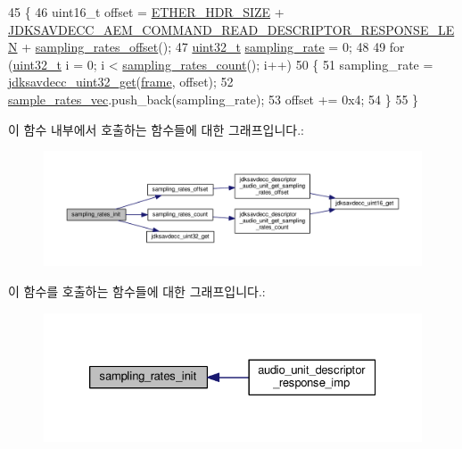 \begin{DoxyCode}
45 \{
46     uint16\_t offset = \hyperlink{namespaceavdecc__lib_a6c827b1a0d973e18119c5e3da518e65ca9512ad9b34302ba7048d88197e0a2dc0}{ETHER\_HDR\_SIZE} + 
      \hyperlink{group__command__read__descriptor__response_ga66447b2275458270651649e1df225406}{JDKSAVDECC\_AEM\_COMMAND\_READ\_DESCRIPTOR\_RESPONSE\_LEN} + 
      \hyperlink{classavdecc__lib_1_1audio__unit__descriptor__response__imp_abb0abe345654eb870a5545190c824846}{sampling\_rates\_offset}();
47     \hyperlink{parse_8c_a6eb1e68cc391dd753bc8ce896dbb8315}{uint32\_t} \hyperlink{structjdksavdecc__aem__command__set__sampling__rate_ab17c387eb7798bbb74ccfedd6f4cf21b}{sampling\_rate} = 0;
48 
49     \textcolor{keywordflow}{for} (\hyperlink{parse_8c_a6eb1e68cc391dd753bc8ce896dbb8315}{uint32\_t} i = 0; i < \hyperlink{classavdecc__lib_1_1audio__unit__descriptor__response__imp_a2b813db0314210fe2bb1a249044628d4}{sampling\_rates\_count}(); i++)
50     \{
51         sampling\_rate = \hyperlink{group__endian_gaefcf5bd4f368997a82f358ab89052d6b}{jdksavdecc\_uint32\_get}(\hyperlink{gst__avb__playbin_8c_ac8e710e0b5e994c0545d75d69868c6f0}{frame}, offset);
52         \hyperlink{classavdecc__lib_1_1audio__unit__descriptor__response__imp_afacabe0a814fd76dd372964eee4a7f75}{sample\_rates\_vec}.push\_back(sampling\_rate);
53         offset += 0x4;
54     \}
55 \}
\end{DoxyCode}


이 함수 내부에서 호출하는 함수들에 대한 그래프입니다.\+:
\nopagebreak
\begin{figure}[H]
\begin{center}
\leavevmode
\includegraphics[width=350pt]{classavdecc__lib_1_1audio__unit__descriptor__response__imp_ab8a665e6ba5c445926238634d7fabfb8_cgraph}
\end{center}
\end{figure}




이 함수를 호출하는 함수들에 대한 그래프입니다.\+:
\nopagebreak
\begin{figure}[H]
\begin{center}
\leavevmode
\includegraphics[width=326pt]{classavdecc__lib_1_1audio__unit__descriptor__response__imp_ab8a665e6ba5c445926238634d7fabfb8_icgraph}
\end{center}
\end{figure}


